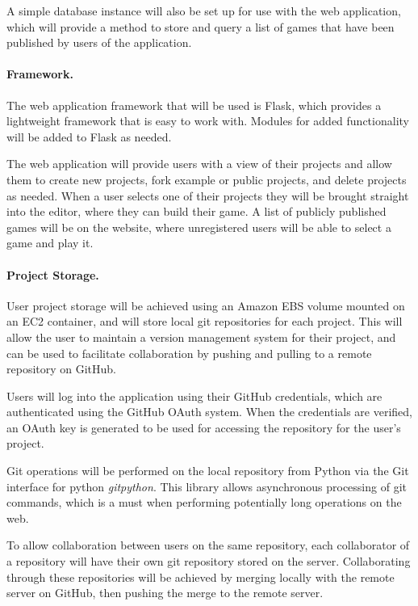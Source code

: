 \documentclass[a4paper, 12pt]{article}
\begin{document}
A simple database instance will also be set up for use with the web application, which will provide a method to store and query a list of games that have been published by users of the application.

\paragraph{Framework.}
The web application framework that will be used is Flask, which provides a lightweight framework that is easy to work with. Modules for added functionality will be added to Flask as needed.

The web application will provide users with a view of their projects and allow them to create new projects, fork example or public projects, and delete projects as needed. When a user selects one of their projects they will be brought straight into the editor, where they can build their game. A list of publicly published games will be on the website, where unregistered users will be able to select a game and play it.

\paragraph{Project Storage.}
User project storage will be achieved using an Amazon EBS volume mounted on an EC2 container, and will store local git repositories for each project. This will allow the user to maintain a version management system for their project, and can be used to facilitate collaboration by pushing and pulling to a remote repository on GitHub.

Users will log into the application using their GitHub credentials, which are authenticated using the GitHub OAuth system. When the credentials are verified, an OAuth key is generated to be used for accessing the repository for the user's project.

Git operations will be performed on the local repository from Python via the Git interface for python \emph{gitpython}. This library allows asynchronous processing of git commands, which is a must when performing potentially long operations on the web.

To allow collaboration between users on the same repository, each collaborator of a repository will have their own git repository stored on the server. Collaborating through these repositories will be achieved by merging locally with the remote server on GitHub, then pushing the merge to the remote server.
\end{document}
